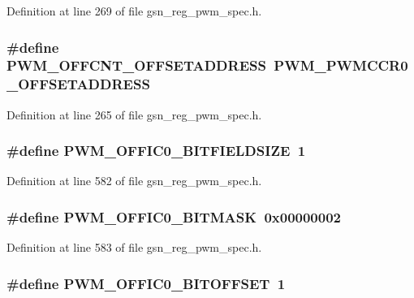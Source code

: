 Definition at line 269 of file gsn\_\-reg\_\-pwm\_\-spec.h.

\hypertarget{a00565_a2cf73b7444de137029b012f9e299083b}{
\subsubsection[{PWM\_\-OFFCNT\_\-OFFSETADDRESS}]{\setlength{\rightskip}{0pt plus 5cm}\#define PWM\_\-OFFCNT\_\-OFFSETADDRESS~PWM\_\-PWMCCR0\_\-OFFSETADDRESS}}
\label{a00565_a2cf73b7444de137029b012f9e299083b}


Definition at line 265 of file gsn\_\-reg\_\-pwm\_\-spec.h.

\hypertarget{a00565_aed02228d5918701750e7268012c37063}{
\subsubsection[{PWM\_\-OFFIC0\_\-BITFIELDSIZE}]{\setlength{\rightskip}{0pt plus 5cm}\#define PWM\_\-OFFIC0\_\-BITFIELDSIZE~1}}
\label{a00565_aed02228d5918701750e7268012c37063}


Definition at line 582 of file gsn\_\-reg\_\-pwm\_\-spec.h.

\hypertarget{a00565_a80e891db0c3f2402d67feb80cc462e44}{
\subsubsection[{PWM\_\-OFFIC0\_\-BITMASK}]{\setlength{\rightskip}{0pt plus 5cm}\#define PWM\_\-OFFIC0\_\-BITMASK~0x00000002}}
\label{a00565_a80e891db0c3f2402d67feb80cc462e44}


Definition at line 583 of file gsn\_\-reg\_\-pwm\_\-spec.h.

\hypertarget{a00565_a558b49b89b6c5d1601fe3906a07a62c4}{
\subsubsection[{PWM\_\-OFFIC0\_\-BITOFFSET}]{\setlength{\rightskip}{0pt plus 5cm}\#define PWM\_\-OFFIC0\_\-BITOFFSET~1}}
\label{a00565_a558b49b89b6c5d1601fe3906a07a62c4}


